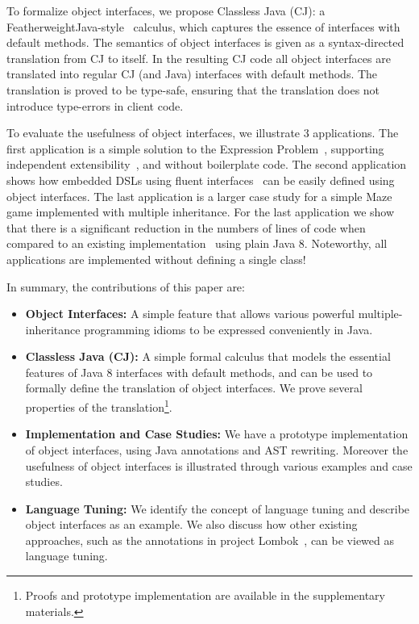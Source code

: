 To formalize object interfaces, we propose Classless Java (CJ): a
FeatherweightJava-style~\cite{Igarashi01FJ} calculus, which captures the essence
of interfaces with default methods. The semantics of object interfaces
is given as a syntax-directed translation from CJ to itself. In the
resulting CJ code all object interfaces are translated into regular CJ
(and Java) interfaces with default methods. The translation is proved
to be type-safe, ensuring that the translation does not
introduce type-errors in client code. 

To evaluate the usefulness of object interfaces, we illustrate 3
applications. The first application is a simple 
solution to the Expression Problem~\cite{wadler98expression}, supporting independent 
extensibility~\cite{zenger05independentlyextensible}, and without boilerplate code. The second
application shows how embedded DSLs using fluent interfaces~\cite{fowler2005fluentinterface} 
can be easily defined using object interfaces. The last
application is a larger case study for a simple Maze game implemented with 
multiple inheritance. For the last application we show that there is a
significant reduction in the numbers of lines of code when compared 
to an existing implementation~\cite{bono14} using plain Java 8. 
Noteworthy, all applications are implemented 
without defining a single class!

In summary, the contributions of this paper are:
\begin{itemize}

\item {\bf Object Interfaces:} A simple feature that allows various
  powerful multiple-inheritance programming idioms to be expressed
  conveniently in Java.

\item {\bf Classless Java (CJ):} A simple formal calculus that models 
the essential features of Java 8 interfaces with default methods, and 
can be used to formally define the translation of object interfaces. 
We prove several properties of the translation\footnote{Proofs and prototype implementation are available in
  the supplementary materials.}.

\item {\bf Implementation and Case Studies:} We have a prototype
  implementation of object interfaces, using Java
  annotations and AST rewriting. Moreover the usefulness of object interfaces is
  illustrated through various examples and case studies.

\item{\bf Language Tuning:} We identify the concept of language tuning 
and describe object interfaces as an example. We also discuss 
how other existing approaches, such as the annotations in project 
Lombok~\cite{lombok},  can be viewed as language tuning.

\end{itemize}
